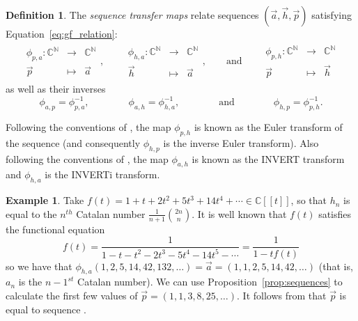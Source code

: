 \documentclass[11pt]{amsart}
\theoremstyle{definition}
\newtheorem{definition}[theorem]{Definition}
\newtheorem{example}[theorem]{Example}
\numberwithin{equation}{section}
\def\NN{{\mathbb N}}
\def\CC{{\mathbb C}}
\begin{document}
\begin{definition}
\label{defn:sequencetransfer}
The \emph{sequence transfer maps} relate sequences $(\vec{a}, \vec{h}, \vec{p})$ satisfying Equation~\eqref{eq:gf_relation}:
\begin{align*}
\begin{array}{rcl}
\phi_{p, a} : \CC^{\NN} & \to & \CC^{\NN} \\
\vec{p} & \mapsto & \vec{a}
\end{array},
\qquad
\begin{array}{rcl}
\phi_{h, a} : \CC^{\NN} & \to & \CC^{\NN} \\
\vec{h} & \mapsto & \vec{a}
\end{array},
\qquad\text{and}\qquad 
\begin{array}{rcl}
\phi_{p, h} : \CC^{\NN} & \to & \CC^{\NN} \\
\vec{p} & \mapsto & \vec{h}
\end{array}
\end{align*}
as well as their inverses
\[
\phi_{a, p} = \phi_{p, a}^{-1},
\qquad\qquad
\phi_{a, h} = \phi_{h, a}^{-1},
\qquad\qquad\text{and}\qquad\qquad
\phi_{h, p} = \phi_{p, h}^{-1}.
\]
\end{definition}

Following the conventions of \cite{OEIS}, the map $\phi_{p,h}$ is known
as the Euler transform of the sequence
(and consequently $\phi_{h,p}$ is the inverse Euler transform).
Also following the conventions
of \cite{OEIS},
the map $\phi_{a,h}$ is known as the INVERT transform
and $\phi_{h,a}$ is the INVERTi transform.

\begin{example}
\label{ex:catalan}
Take $f(t) = 1 + t + 2 t^{2} + 5t^3 + 14t^4 + \cdots \in \CC[[t]]$,
so that $h_n$ is equal to the $n^{th}$ Catalan number
$\frac{1}{n+1}\binom{2n}{n}$.  It is well known that $f(t)$ satisfies the functional equation
\[
f(t) = \frac{1}{1 - t - t^2 - 2t^3 - 5t^4 - 14t^5 - \cdots} = \frac{1}{1-t f(t)}
\]
so we have that $\phi_{h,a}(1,2,5,14,42,132,\ldots) = \vec{a} = (1,1,2,5,14,42, \ldots)$
(that is, $a_n$ is the $n-1^{st}$ Catalan number).
We can use Proposition~\ref{prop:sequences} to calculate the first few values of $\vec{p} = (1,1,3,8,25, \ldots)$.
It follows from \cite[Section 5.1.3]{NT05} that $\vec{p}$ is equal to sequence \cite[A022553]{OEIS}.
\end{example}
\end{document}

